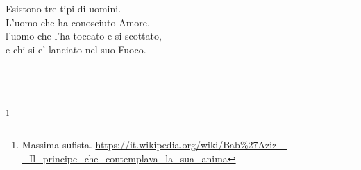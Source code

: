 \begin{vcentered}
    \begin{poem}
        Esistono tre tipi di uomini. \\
        L'uomo che ha conosciuto Amore, \\
        l'uomo che l'ha toccato e si scottato, \\
        e chi si e' lanciato nel suo Fuoco.\\
    \end{poem}
    \leavevmode\\
    \leavevmode\\
    \leavevmode\\
    \footnote{Massima sufista. \url{https://it.wikipedia.org/wiki/Bab\%27Aziz\_-\_Il\_principe\_che\_contemplava\_la\_sua\_anima}}
\end{vcentered}
